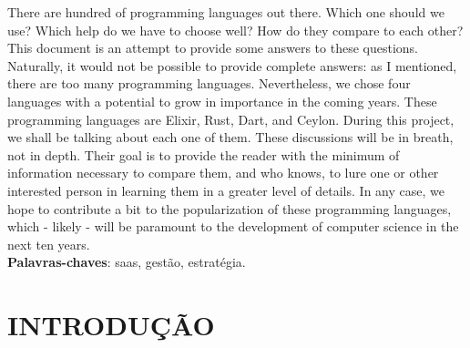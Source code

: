 \documentclass{abnt}
\begin{document}





 

\capa
\folhaderosto

\begin{resumo}
There are hundred of programming languages out there. Which one should we use?
Which help do we have to choose well? How do they compare to each other? This
document is an attempt to provide some answers to these questions. Naturally, it
would not be possible to provide complete answers: as I mentioned, there are too
many programming languages. Nevertheless, we chose four languages with a
potential to grow in importance in the coming years. These programming languages
are Elixir, Rust, Dart, and Ceylon. During this project, we shall be
talking about each one of them. These discussions will be in breath, not in
depth. Their goal is to provide the reader with the minimum of information
necessary to compare them, and who knows, to lure one or other interested person
in learning them in a greater level of details. In any case, we hope to
contribute a bit to the popularization of these programming languages, which -
likely - will be paramount to the development of computer science in the next
ten years.\\


\textbf{Palavras-chaves}: saas, gestão, estratégia.
\end{resumo}

\sumario %
\renewcommand*\listfigurename{LISTA DE FIGURAS}
\listoffigures %


\chapter{INTRODUÇÃO}
\end{document}
